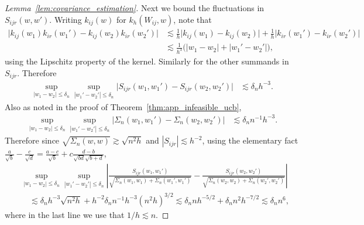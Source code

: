 \begin{proof}[Lemma~\ref{lem:covariance_estimation}]

  Next we bound the fluctuations in $S_{i j r}(w,w')$.
  Writing $k_{i j}(w)$ for $k_h(W_{i j},w)$,
  note that
  \begin{align*}
    \big|
    k_{i j}(w_1)
    k_{i r}(w_1')
    - k_{i j}(w_2)
    k_{i r}(w_2')
    \big|
    &\lesssim
    \frac{1}{h}
    \big| k_{i j}(w_1) - k_{i j}(w_2) \big|
    +
    \frac{1}{h}
    \big| k_{i r}(w_1') - k_{i r}(w_2') \big| \\
    &\lesssim
    \frac{1}{h^3}
    \Big(
      |w_1 - w_2|
      + |w_1' - w_2'|
    \Big),
  \end{align*}
  using the Lipschitz property of the kernel.
  Similarly for the other summands in $S_{i j r}$.
  Therefore
  \begin{align*}
    \sup_{|w_1-w_2| \leq \delta_n}
    \sup_{|w_1'-w_2'| \leq \delta_n}
    \big|
    S_{i j r}(w_1, w_1')
    - S_{i j r}(w_2, w_2')
    \big|
    &\lesssim
    \delta_n h^{-3}.
  \end{align*}
  Also as noted in the proof of Theorem~\ref{thm:app_infeasible_ucb},
  \begin{align*}
    \sup_{|w_1-w_2| \leq \delta_n}
    \sup_{|w_1'-w_2'| \leq \delta_n}
    \big|
    \Sigma_n(w_1,w_1')
    -
    \Sigma_n(w_2, w_2')
    \big|
    &\lesssim
    \delta_n n^{-1}h^{-3}.
  \end{align*}
  Therefore since $\sqrt{\Sigma_n(w,w)} \gtrsim \sqrt{n^2h}$
  and $|S_{i j r}| \lesssim h^{-2}$,
  using the elementary fact
  $\frac{a}{\sqrt b} - \frac{c}{\sqrt d}
  = \frac{a-c}{\sqrt b} + c \frac{d-b}{\sqrt{b d} \sqrt{b+d}}$,
  \begin{align*}
    &\sup_{|w_1-w_2| \leq \delta_n}
    \sup_{|w_1'-w_2'| \leq \delta_n}
    \left|
    \frac{S_{i j r}(w_1, w_1')}
    {\sqrt{\Sigma_n(w_1,w_1) + \Sigma_n(w_1',w_1')}}
    - \frac{S_{i j r}(w_2, w_2')}
    {\sqrt{\Sigma_n(w_2,w_2) + \Sigma_n(w_2',w_2')}}
    \right| \\
    &\quad\lesssim
    \delta_n h^{-3} \sqrt{n^2h}
    + h^{-2} \delta_n n^{-1} h^{-3} (n^2h)^{3/2}
    \lesssim
    \delta_n n h^{-5/2}
    + \delta_n n^{2} h^{-7/2}
    \lesssim
    \delta_n n^{6},
  \end{align*}
  where in the last line we use that
  $1/h \lesssim n$.



\end{proof}
